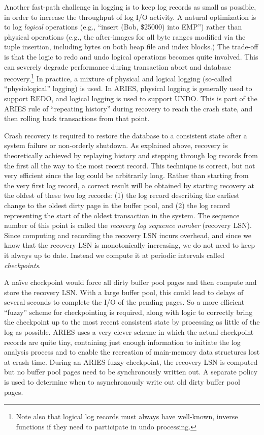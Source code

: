 \documentclass[a4paper,11pt,twoside,openright]{book}
\begin{document}
Another fast-path challenge in logging is to keep log records as small
as possible, in order to increase the throughput of log I/O activity. A
natural optimization is to log \emph{logical} operations (e.g., ``insert
(Bob, \$25000) into EMP'') rather than physical operations (e.g., the
after-images for all byte ranges modified via the tuple insertion,
including bytes on both heap file and index blocks.) The trade-off is
that the logic to redo and undo logical operations becomes quite
involved. This can severely degrade performance during transaction abort
and database recovery.\footnote{Note also that logical log records must always have well-known,
inverse functions if they need to participate in undo processing.} In practice, a mixture of
physical and logical logging (so-called ``physiological'' logging) is
used. In ARIES, physical logging is generally used to support REDO, and
logical logging is used to support UNDO. This is part of the ARIES rule
of ``repeating history'' during recovery to reach the crash state, and
then rolling back transactions from that point.

Crash recovery is required to restore the database to a consistent state
after a system failure or non-orderly shutdown. As explained above,
recovery is theoretically achieved by replaying history and stepping
through log records from the first all the way to the most recent
record. This technique is correct, but not very efficient since the log
could be arbitrarily long. Rather than starting from the very first log
record, a correct result will be obtained by starting recovery at the
oldest of these two log records: (1) the log record describing the
earliest change to the oldest dirty page in the buffer pool, and (2) the
log record representing the start of the oldest transaction in the
system. The sequence number of this point is called the \emph{recovery
log sequence} \emph{number} (recovery LSN). Since computing and
recording the recovery LSN incurs overhead, and since we know that the
recovery LSN is
monotonically increasing, we do not need to keep it always up to date.
Instead we compute it at periodic intervals called \emph{checkpoints}.

A na\"ive checkpoint would force all dirty buffer pool pages and then
compute and store the recovery LSN. With a large buffer pool, this could
lead to delays of several seconds to complete the I/O of the pending
pages. So a more efficient ``fuzzy'' scheme for checkpointing is
required, along with logic to correctly bring the checkpoint up to the
most recent consistent state by processing as little of the log as
possible. ARIES uses a very clever scheme in which the actual checkpoint
records are quite tiny, containing just enough information to initiate
the log analysis process and to enable the recreation of main-memory
data structures lost at crash time. During an ARIES fuzzy checkpoint,
the recovery LSN is computed but no buffer pool pages need to be
synchronously written out. A separate policy is used to determine when
to asynchronously write out old dirty buffer pool pages.
\end{document}

